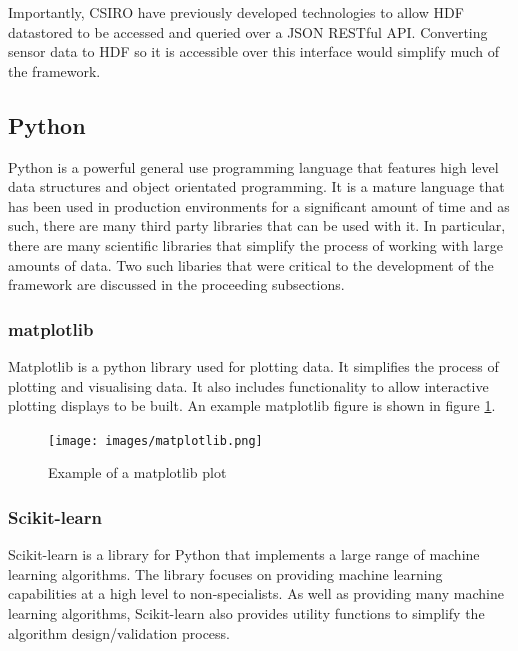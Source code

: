 Importantly, CSIRO have previously developed technologies to allow HDF datastored to be accessed and queried over a JSON RESTful API. Converting sensor data to HDF so it is accessible over this interface would simplify much of the framework. 

\subsection{Python}
Python is a powerful general use programming language that features high level data structures and object orientated programming. \cite{van2003introduction} It is a mature language that has been used in production environments for a significant amount of time and as such, there are many third party libraries that can be used with it. In particular, there are many scientific libraries that simplify the process of working with large amounts of data. Two such libaries that were critical to the development of the framework are discussed in the proceeding subsections. 

\subsubsection{matplotlib}
Matplotlib is a python library used for plotting data. \cite{hunter2007matplotlib} It simplifies the process of plotting and visualising data. It also includes functionality to allow interactive plotting displays to be built. An example matplotlib figure is shown in figure \ref{matplotlib}.

\begin{figure}[ht!]
\begin{center}
\leavevmode
\texttt{[image: images/matplotlib.png]}
\end{center}
\caption{Example of a matplotlib plot}
\label{matplotlib}
\end{figure}

\subsubsection{Scikit-learn}

Scikit-learn is a library for Python that implements a large range of machine learning algorithms. The library focuses on providing machine learning capabilities at a high level to non-specialists. \cite{pedregosa2011scikit} As well as providing many machine learning algorithms, Scikit-learn also provides utility functions to simplify the algorithm design/validation process. 

